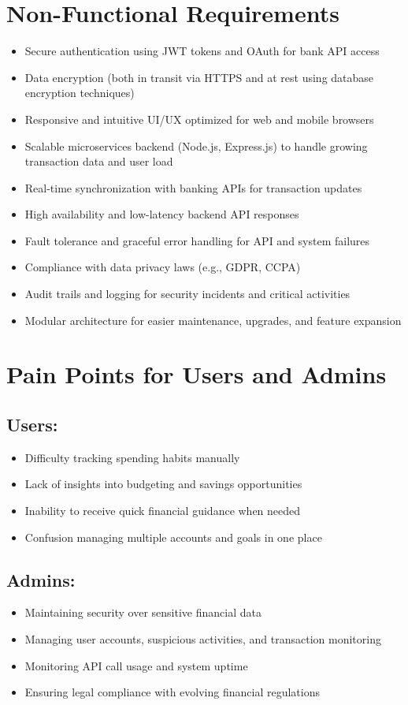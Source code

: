 \documentclass{article}
\begin{document}
\section{Non-Functional Requirements}
\begin{itemize}
    \item Secure authentication using JWT tokens and OAuth for bank API access
    \item Data encryption (both in transit via HTTPS and at rest using database encryption techniques)
    \item Responsive and intuitive UI/UX optimized for web and mobile browsers
    \item Scalable microservices backend (Node.js, Express.js) to handle growing transaction data and user load
    \item Real-time synchronization with banking APIs for transaction updates
    \item High availability and low-latency backend API responses
    \item Fault tolerance and graceful error handling for API and system failures
    \item Compliance with data privacy laws (e.g., GDPR, CCPA)
    \item Audit trails and logging for security incidents and critical activities
    \item Modular architecture for easier maintenance, upgrades, and feature expansion
\end{itemize}

\section{Pain Points for Users and Admins}
\subsection*{Users:}
\begin{itemize}
    \item Difficulty tracking spending habits manually
    \item Lack of insights into budgeting and savings opportunities
    \item Inability to receive quick financial guidance when needed
    \item Confusion managing multiple accounts and goals in one place
\end{itemize}

\subsection*{Admins:}
\begin{itemize}
    \item Maintaining security over sensitive financial data
    \item Managing user accounts, suspicious activities, and transaction monitoring
    \item Monitoring API call usage and system uptime
    \item Ensuring legal compliance with evolving financial regulations
\end{itemize}
\end{document}
